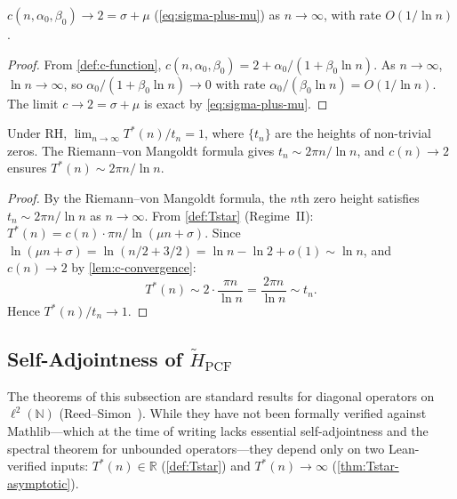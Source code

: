 \begin{Lemma}\label{lem:c-convergence}
$c(n,\alpha_0,\beta_0) \to 2 = \sigma + \mu$
(\cref{eq:sigma-plus-mu}) as $n\to\infty$, with rate $O(1/\ln n)$.
\end{Lemma}

\begin{proof}
From \cref{def:c-function},
$c(n,\alpha_0,\beta_0) = 2 + \alpha_0/(1+\beta_0\ln n)$.
As $n\to\infty$, $\ln n\to\infty$, so
$\alpha_0/(1+\beta_0\ln n)\to 0$ with rate
$\alpha_0/(\beta_0\ln n) = O(1/\ln n)$.
The limit $c\to 2 = \sigma+\mu$ is exact by
\cref{eq:sigma-plus-mu}.
\end{proof}

\begin{Theorem}\label{thm:Tstar-asymptotic}
Under RH, $\lim_{n\to\infty} T^*(n)/t_n = 1$, where $\{t_n\}$ are the
heights of non-trivial zeros. The Riemann--von Mangoldt formula gives
$t_n\sim 2\pi n/\ln n$, and $c(n)\to 2$ ensures $T^*(n)\sim 2\pi n/\ln n$.
\end{Theorem}

\begin{proof}
By the Riemann--von Mangoldt formula, the $n$th zero height satisfies
$t_n \sim 2\pi n/\ln n$ as $n\to\infty$.
From \cref{def:Tstar} (Regime~II):
$T^*(n) = c(n)\cdot\pi n/\ln(\mu n + \sigma)$.
Since $\ln(\mu n + \sigma) = \ln(n/2+3/2) = \ln n -\ln 2 + o(1)
\sim \ln n$, and $c(n)\to 2$ by \cref{lem:c-convergence}:
\[
  T^*(n) \sim 2\cdot\frac{\pi n}{\ln n} = \frac{2\pi n}{\ln n}
  \sim t_n.
\]
Hence $T^*(n)/t_n\to 1$.
\end{proof}


\subsection{Self-Adjointness of \texorpdfstring{$\tilde{H}_{\mathrm{PCF}}$}{H_PCF}}\label{ssec:self-adjoint}

\begin{Remark}\label{rmk:scope-sa}
The theorems of this subsection are standard results for diagonal
operators on~$\ell^2(\mathbb{N})$
(Reed--Simon~\cite{REED1972249}).
While they have not been formally verified against Mathlib---which
at the time of writing lacks essential self-adjointness and the
spectral theorem for unbounded operators---they depend only on two
Lean-verified inputs: $T^*(n)\in\mathbb{R}$ (\cref{def:Tstar})
and $T^*(n)\to\infty$ (\cref{thm:Tstar-asymptotic}).
\end{Remark}

